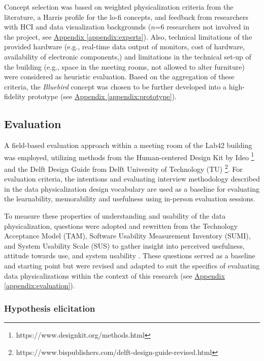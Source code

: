 Concept selection was based on weighted physicalization criteria from the literature, a Harris profile for the lo-fi concepts, and feedback from researchers with HCI and data visualization backgrounds ($n$=6 researchers not involved in the project, see \hyperref[appendix:experts]{Appendix \ref*{appendix:experts}}). Also, technical limitations of the provided hardware (e.g., real-time data output of monitors, cost of hardware, availability of electronic components,) and limitations in the technical set-up of the building (e.g., space in the meeting rooms, not allowed to alter furniture) were considered as heuristic evaluation. Based on the aggregation of these criteria, the \textit{Bluebird} concept was chosen to be further developed into a high-fidelity prototype (see \hyperref[appendix:prototype]{Appendix \ref*{appendix:prototype}}).

\subsection{Evaluation}
\label{sec:evaluation}

A field-based evaluation approach within a meeting room of the Lab42 building was employed, utilizing methods from the Human-centered Design Kit by Ideo \footnote{https://www.designkit.org/methods.html} and the Delft Design Guide from Delft University of Technology (TU) \footnote{https://www.bispublishers.com/delft-design-guide-revised.html}. For evaluation criteria, the intentions and evaluating interview methodology described in the data physicalization design vocabulary \cite{jansen_evaluating_2013,ranasinghe_encoding_2023} are used as a baseline for evaluating the learnability, memorability and usefulness using in-person evaluation sessions. 

To measure these properties of understanding and usability of the data physicalization, questions were adopted and rewritten from the Technology Acceptance Model (TAM), Software Usability Measurement Inventory (SUMI), and System Usability Scale (SUS) to gather insight into perceived usefulness, attitude towards use, and system usability \cite{davis_perceived_1989, brooke_sus_1996}. These questions served as a baseline and starting point but were revised and adapted to suit the specifics of evaluating data physicalizations within the context of this research (see \hyperref[appendix:evaluation]{Appendix \ref*{appendix:evaluation}}).

\subsubsection{Hypothesis elicitation}

